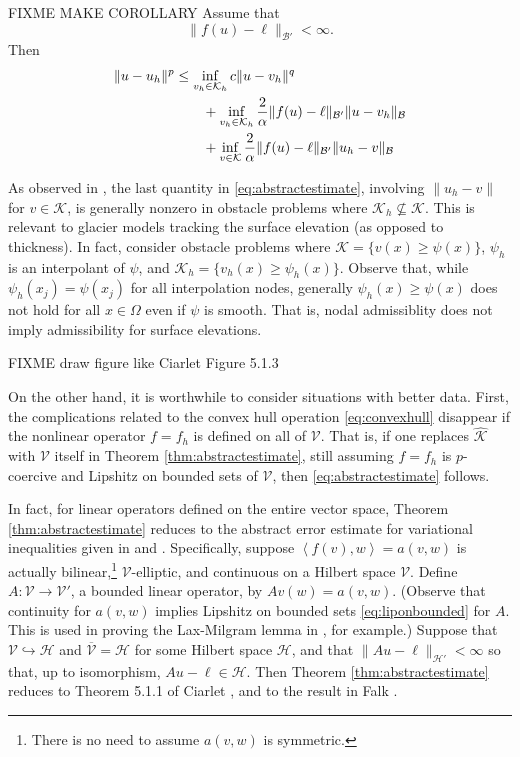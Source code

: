 \documentclass[hidelinks,onefignum,onetabnum,final]{siamart220329}  %
\newcommand{\cB}{\mathcal{B}}
\newcommand{\cH}{\mathcal{H}}
\newcommand{\cK}{\mathcal{K}}
\newcommand{\cV}{\mathcal{V}}
\newcommand{\hcK}{\widehat{\cK}}
\newcommand{\ip}[2]{\left<#1,#2\right>}
\begin{document}
FIXME MAKE COROLLARY Assume that
\begin{equation}
\|f(u)-\ell\|_{\cB'} < \infty.  \label{eq:fellboundedB}
\end{equation}
Then
\begin{align}
\|u-u_h\|^p &\le \inf_{v_h\in\cK_h} c \|u - v_h\|^q  \label{eq:NORMabstractestimate} \\
   &\qquad + \inf_{v_h\in\cK_h} \frac{2}{\alpha} \|f(u)-\ell\|_{\cB'} \|u-v_h\|_{\cB} \notag \\
   &\qquad + \inf_{v\in\cK} \frac{2}{\alpha} \|f(u)-\ell\|_{\cB'} \|u_h-v\|_{\cB} \notag
\end{align}

As observed in \cite{Ciarlet2002}, the last quantity in \eqref{eq:abstractestimate}, involving $\|u_h-v\|$ for $v\in\cK$, is generally nonzero in obstacle problems where $\cK_h \nsubseteq \cK$.  This is relevant to glacier models tracking the surface elevation (as opposed to thickness).  In fact, consider obstacle problems where $\cK=\{v(x)\ge \psi(x)\}$, $\psi_h$ is an interpolant of $\psi$, and $\cK_h=\{v_h(x)\ge \psi_h(x)\}$.  Observe that, while $\psi_h(x_j)=\psi(x_j)$ for all interpolation nodes, generally $\psi_h(x) \ge \psi(x)$ does not hold for all $x\in\Omega$ even if $\psi$ is smooth.  That is, nodal admissiblity does not imply admissibility for surface elevations.

FIXME draw figure like Ciarlet Figure 5.1.3

On the other hand, it is worthwhile to consider situations with better data.  First, the complications related to the convex hull operation \eqref{eq:convexhull} disappear if the nonlinear operator $f=f_h$ is defined on all of $\cV$.  That is, if one replaces $\hcK$ with $\cV$ itself in Theorem \ref{thm:abstractestimate}, still assuming $f=f_h$ is $p$-coercive and Lipshitz on bounded sets of $\cV$, then \eqref{eq:abstractestimate} follows.

In fact, for linear operators defined on the entire vector space, Theorem \eqref{thm:abstractestimate} reduces to the abstract error estimate for variational inequalities given in \cite{Ciarlet2002} and \cite{Falk1974}.  Specifically, suppose $\ip{f(v)}{w}=a(v,w)$ is actually bilinear,\footnote{There is no need to assume $a(v,w)$ is symmetric.} $\cV$-elliptic, and continuous on a Hilbert space $\cV$.  Define $A:\cV\to\cV'$, a bounded linear operator, by $Av(w) = a(v,w)$. (Observe that continuity for $a(v,w)$ implies Lipshitz on bounded sets \eqref{eq:liponbounded} for $A$.  This is used in proving the Lax-Milgram lemma in \cite{Ciarlet2002}, for example.)  Suppose that $\cV\hookrightarrow \cH$ and $\overline{\cV} = \cH$ for some Hilbert space $\cH$, and that $\|Au-\ell\|_{\cH'} < \infty$ so that, up to isomorphism, $Au-\ell \in\cH$.  Then Theorem \ref{thm:abstractestimate} reduces to Theorem 5.1.1 of Ciarlet \cite{Ciarlet2002}, and to the result in Falk \cite{Falk1974}.
\end{document}
